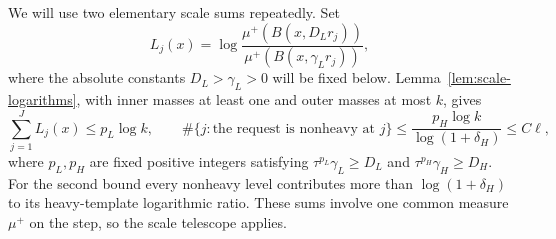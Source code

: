 We will use two elementary scale sums repeatedly.  Set
\[
 L_j(x)=\log\frac{\mu^+(B(x,D_Lr_j))}
                         {\mu^+(B(x,\gamma_Lr_j))},
\]
where the absolute constants \(D_L>\gamma_L>0\) will be fixed below.
Lemma~\ref{lem:scale-logarithms}, with inner masses at least one and outer
masses at most \(k\), gives
\begin{equation}\label{eq:partition-log-sums}
 \sum_{j=1}^J L_j(x)\le p_L\log k,
 \qquad
 \#\{j:\text{the request is nonheavy at }j\}
 \le\frac{p_H\log k}{\log(1+\delta_H)}\le C\ell,
\end{equation}
where \(p_L,p_H\) are fixed positive integers satisfying
\(\tau^{p_L}\gamma_L\ge D_L\) and
\(\tau^{p_H}\gamma_H\ge D_H\).  For the second bound every nonheavy
level contributes more than \(\log(1+\delta_H)\) to its heavy-template
logarithmic ratio.  These sums involve one common measure \(\mu^+\) on
the step, so the scale telescope applies.

